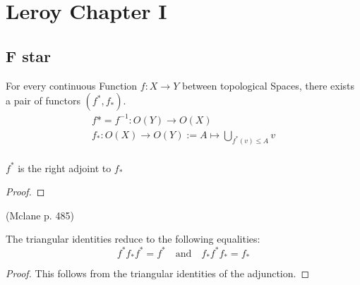 \chapter{Leroy Chapter I}


\section{F star}

\begin{definition}[$f^*$ and $f_*$]
    \label{def:f_star}
    \leanok
    For every continuous Function $f : X \rightarrow Y$ between topological Spaces, there exists a pair of functors $(f^*,f_*)$.
    \begin{gather*}
        f* = f^{-1} : O(Y) \rightarrow O(X)\\
        f_* : O(X) \rightarrow O(Y) := A \mapsto \bigcup_{f^*(v) \le A} v\\
    \end{gather*}
\end{definition}



\begin{lemma}[$f^* \dashv f_*$]
    \label{lem:f_star_adj}
    \leanok
    $f^*$ is the right adjoint to $f_*$
\end{lemma}
\begin{proof}
    \leanok
\end{proof}

\begin{lemma}[triangle]
(Mclane p. 485)

    The triangular identities reduce to the following equalities:
    \[f^*f_*f^* = f^* \quad \text{and} \quad f_*f^*f_* = f_*\]
    \leanok
    \label{lem:triangle}
\end{lemma}
\begin{proof}
    This follows from the triangular identities of the adjunction.
    \leanok
\end{proof}


